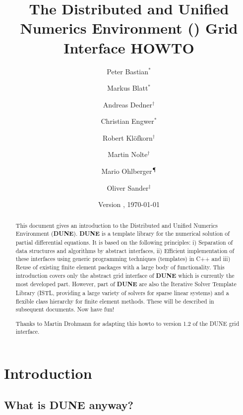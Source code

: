 \documentclass[11pt,a4paper,headinclude,footinclude,DIV16,normalheadings]{scrreprt}
\title{The Distributed and Unified Numerics Environment (\Dune{}) Grid
  Interface HOWTO}
\author{Peter Bastian$^\ast$ \and 
Markus Blatt$^\ast$ \and
Andreas Dedner$^\dagger$ \and 
Christian Engwer$^\ast$ \and  
Robert Kl\"ofkorn$^\dagger$ \and 
Martin Nolte$^\dagger$ \and
Mario Ohlberger$^\mathparagraph$ \and  
Oliver Sander$^\ddagger$}
\date{Version \version, \today}
\newcommand{\Dune}{{\sf\bfseries DUNE}\xspace}
\begin{document}
\maketitle

\begin{abstract}
This document gives an introduction to the Distributed and Unified
Numerics Environment (\Dune). \Dune{} is a template library for the
numerical solution of partial differential equations. It is based on
the following principles: i) Separation of data structures and
algorithms by abstract interfaces, ii) Efficient implementation of these
interfaces using generic programming techniques (templates) in C++ and
iii) Reuse of existing finite element packages with a large body of
functionality. This introduction covers only the abstract grid interface
of \Dune{} which is currently the most developed part. However, part of
\Dune{} are also the Iterative Solver Template Library (ISTL, providing a
large variety of solvers for sparse linear systems) and a flexible class
hierarchy for finite element methods. These will be described in
subsequent documents. Now have fun!

\vspace*{\fill}
Thanks to Martin Drohmann for adapting this howto to version 1.2 of the
DUNE grid interface.
\end{abstract}

\tableofcontents


\chapter{Introduction}

\section{What is \texorpdfstring{\Dune{}}{DUNE} anyway?}
\end{document}
